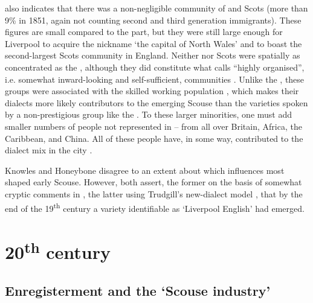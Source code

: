  also indicates that there was a non-negligible community of  and Scots (more than 9\% in 1851, again not counting second and third generation immigrants).
These figures are small compared to the  part, but they were still large enough for Liverpool to acquire the nickname `the capital of North Wales' and to boast the second-largest Scots community in England.
Neither  nor Scots were spatially as concentrated as the , although they did constitute what \citeauthor{honeybone2007} calls ``highly organised'', i.e. somewhat inward-looking and self-sufficient, communities \citep[cf.][120--121]{honeybone2007}.
Unlike the , these groups were associated with the skilled working population \citep[cf.][202--203]{belchem2006b}, which makes their dialects more likely contributors to the emerging Scouse than the varieties spoken by a non-prestigious group like the .
To these larger minorities, one must add smaller numbers of people not represented in  -- from all over Britain, Africa, the Caribbean, and China.
All of these people have, in some way, contributed to the dialect mix in the city \citep[cf.][116]{honeybone2007}.

Knowles and Honeybone disagree to an extent about which influences most shaped early Scouse.
However, both assert, the former on the basis of somewhat cryptic comments in \citealt{ellis1889} \citep[cf.][18]{knowles1973}, the latter using Trudgill's new-dialect model \citep[cf.][118]{honeybone2007}, that by the end of the 19\textsuperscript{th} century a variety identifiable as `Liverpool English' had emerged.

	\section{20\textsuperscript{th} century}\label{sec.hist.20}

		\subsection{Enregisterment and the `Scouse industry'}\label{sec.hist.20.industry}

